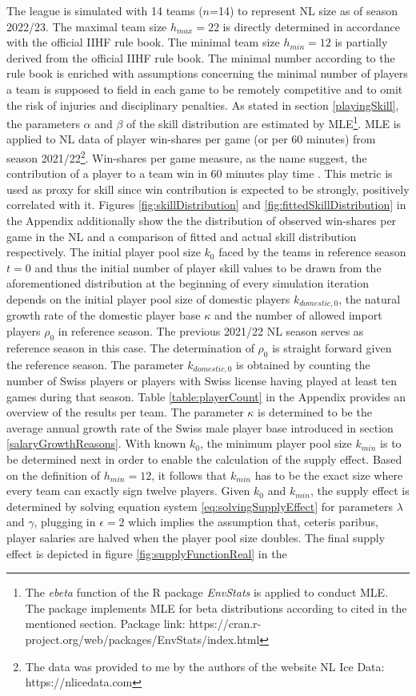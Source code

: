 \documentclass[12pt, a4paper]{article}
\begin{document}
The league is simulated with 14 teams ($n$=14) to represent NL size as of season 2022/23. The maximal team size $h_{max}=22$ is directly determined in accordance with the official IIHF rule book. The minimal team size $h_{min}=12$ is partially derived from the official IIHF rule book. The minimal number according to the rule book is enriched with assumptions concerning the minimal number of players a team is supposed to field in each game to be remotely competitive and to omit the risk of injuries and disciplinary penalties. As stated in section \ref{playingSkill}, the parameters $\alpha$ and $\beta$ of the skill distribution are estimated by MLE\footnote{The \emph{ebeta} function of the R package \emph{EnvStats} is applied to conduct MLE. The package implements MLE for beta distributions according to \citet{forbes_statistical_2010} cited in the mentioned section. Package link: https://cran.r-project.org/web/packages/EnvStats/index.html}. MLE is applied to NL data of player win-shares per game (or per 60 minutes) from season 2021/22\footnote{The data was provided to me by the authors of the website NL Ice Data: https://nlicedata.com}. Win-shares per game measure, as the name suggest, the contribution of a player to a team win in 60 minutes play time \citep[see][]{nl_ice_data_assessing_2021}. This metric is used as proxy for skill since win contribution is expected to be strongly, positively correlated with it. Figures \ref{fig:skillDistribution} and \ref{fig:fittedSkillDistribution} in the Appendix additionally show the the distribution of observed win-shares per game in the NL and a comparison of fitted and actual skill distribution respectively. The initial player pool size $k_0$ faced by the teams in reference season $t=0$ and thus the initial number of player skill values to be drawn from the aforementioned distribution at the beginning of every simulation iteration depends on the initial player pool size of domestic players $k_{domestic,0}$, the natural growth rate of the domestic player base $\kappa$ and the number of allowed import players $\rho_0$ in reference season. The previous 2021/22 NL season serves as reference season in this case. The determination of $\rho_0$ is straight forward given the reference season. The parameter $k_{domestic,0}$ is obtained by counting the number of Swiss players or players with Swiss license having played at least ten games during that season. Table \ref{table:playerCount} in the Appendix provides an overview of the results per team. The parameter $\kappa$ is determined to be the average annual growth rate of the Swiss male player base introduced in section \ref{salaryGrowthReasons}. With known $k_0$, the minimum player pool size $k_{min}$ is to be determined next in order to enable the calculation of the supply effect. Based on the definition of $h_{min}=12$, it follows that $k_{min}$ has to be the exact size where every team can exactly sign twelve players. Given $k_0$ and $k_{min}$, the supply effect is determined by solving equation system \ref{eq:solvingSupplyEffect} for parameters $\lambda$ and $\gamma$, plugging in $\epsilon=2$ which implies the assumption that, ceteris paribus, player salaries are halved when the player pool size doubles. The final supply effect is depicted in figure \ref{fig:supplyFunctionReal} in the 
\end{document}
